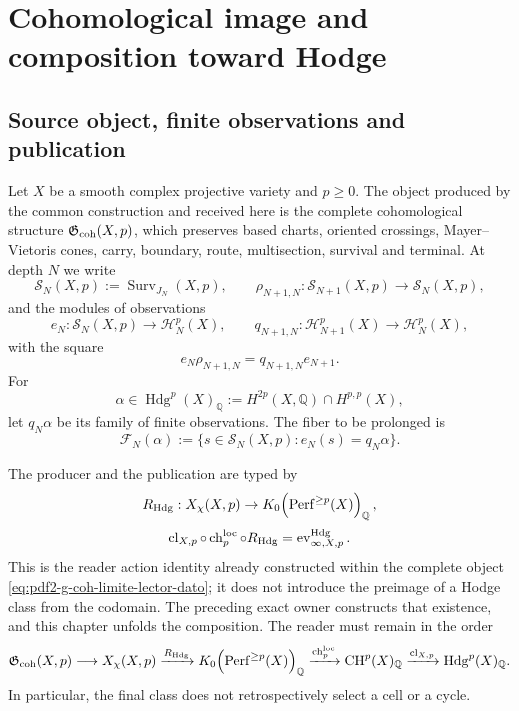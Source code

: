 \chapter{Cohomological image and composition toward Hodge}

\section{Source object, finite observations and publication}

Let $X$ be a smooth complex projective variety and $p\ge0$. The object produced by
the common construction and received here is the complete cohomological structure
$\mathfrak G_{\rm coh}(X,p)$, which preserves
based charts, oriented crossings, Mayer--Vietoris cones, carry,
boundary, route, multisection, survival and terminal. At depth $N$ we
write
\begin{equation}\label{eq:pdf2-hodge-sistemas}
 \mathscr S_N(X,p):=\operatorname{Surv}_{J_N}(X,p),
 \qquad
 \rho_{N+1,N}:\mathscr S_{N+1}(X,p)\to\mathscr S_N(X,p),
\end{equation}
and the modules of observations
\begin{equation}\label{eq:pdf2-hodge-observaciones}
 e_N:\mathscr S_N(X,p)\to\mathscr H_N^p(X),
 \qquad
 q_{N+1,N}:\mathscr H_{N+1}^p(X)\to\mathscr H_N^p(X),
\end{equation}
with the square
\begin{equation}\label{eq:pdf2-hodge-cuadrado-restriccion}
 e_N\rho_{N+1,N}=q_{N+1,N}e_{N+1}.
\end{equation}
For
\[
 \alpha\in\operatorname{Hdg}^p(X)_{\mathbb Q}
 :=H^{2p}(X,\mathbb Q)\cap H^{p,p}(X),
\]
let $q_N\alpha$ be its family of finite observations. The fiber to be
prolonged is
\begin{equation}\label{eq:pdf2-hodge-fibra-alpha}
 \mathscr F_N(\alpha):=
 \{s\in\mathscr S_N(X,p):e_N(s)=q_N\alpha\}.
\end{equation}

The producer and the publication are typed by
\begin{equation}\label{eq:pdf2-hodge-realizador}
 R_{\rm Hdg}:X_\chi(X,p)\to
 K_0\!\left(\operatorname{Perf}^{\ge p}(X)\right)_{\mathbb Q},
\end{equation}
\begin{equation}\label{eq:pdf2-hodge-publicacion}
 \operatorname{cl}_{X,p}\circ\operatorname{ch}^{\rm loc}_p
 \circ R_{\rm Hdg}
 =\operatorname{ev}^{\rm Hdg}_{\infty,X,p}.
\end{equation}
This is the reader action identity already constructed within the complete object
\eqref{eq:pdf2-g-coh-limite-lector-dato}; it does not introduce the
preimage of a Hodge class from the codomain. The preceding exact owner constructs that
existence, and this chapter unfolds the composition. The reader
must remain in the order
\[
 \mathfrak G_{\rm coh}(X,p)
 \longrightarrow X_\chi(X,p)
 \xrightarrow{R_{\rm Hdg}}
 K_0\!\left(\operatorname{Perf}^{\ge p}(X)\right)_{\mathbb Q}
 \xrightarrow{\operatorname{ch}^{\rm loc}_p}
 \operatorname{CH}^p(X)_{\mathbb Q}
 \xrightarrow{\operatorname{cl}_{X,p}}
 \operatorname{Hdg}^p(X)_{\mathbb Q}.
\]
In particular, the final class does not retrospectively select a cell or a cycle.


